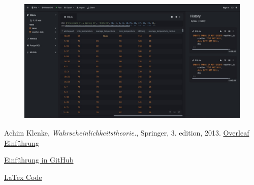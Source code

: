 \documentclass{article}
\begin{document}
\begin{figure}
    \centering
    \includegraphics[width=0.5\linewidth]{Bild4.jpeg}
    \caption{}
    \label{Abb4}
\end{figure}

\newpage
\renewcommand{\refname}{Literatur}
\begin{thebibliography}{9}
    Achim Klenke,
    \textit{Wahrscheinlichkeitstheorie.},
    Springer, 3. edition, 
    2013.
\href{https://de.overleaf.com/learn/how-to/Creating_a_document_in_Overleaf}{Overleaf Einführung}

\href{https://docs.github.com/de/get-started/start-your-journey/hello-world}{Einführung in GitHub}

\href{https://github.com/arman-avet777/comet_abgabe.git}{LaTex Code}
\end{thebibliography}
\end{document}
